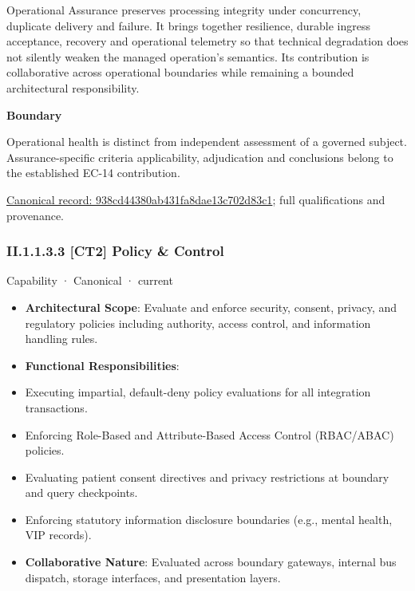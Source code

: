 Operational Assurance preserves processing integrity under concurrency, duplicate delivery and failure. It brings together resilience, durable ingress acceptance, recovery and operational telemetry so that technical degradation does not silently weaken the managed operation's semantics. Its contribution is collaborative across operational boundaries while remaining a bounded architectural responsibility.



\textbf{Boundary}



Operational health is distinct from independent assessment of a governed subject. Assurance-specific criteria applicability, adjudication and conclusions belong to the established EC-14 contribution.


{\footnotesize \href{../../../../../../../continuum/strategy/capability/938cd44380ab431fa8dae13c702d83c1.md}{Canonical record: 938cd44380ab431fa8dae13c702d83c1}; full qualifications and provenance.}\par
\subsubsection*{II.1.1.3.3 [CT2] Policy \& Control}
\label{navigation:II.1.1.3.3}

\label{element:0c5d986cc948421a8bebcab3b74d108f}
{\small Capability · Canonical · current}\par

\begin{itemize}


\item \textbf{Architectural Scope}: Evaluate and enforce security, consent, privacy, and regulatory policies including authority, access control, and information handling rules.

\item \textbf{Functional Responsibilities}:

\item Executing impartial, default-deny policy evaluations for all integration transactions.

\item Enforcing Role-Based and Attribute-Based Access Control (RBAC/ABAC) policies.

\item Evaluating patient consent directives and privacy restrictions at boundary and query checkpoints.

\item Enforcing statutory information disclosure boundaries (e.g., mental health, VIP records).

\item \textbf{Collaborative Nature}: Evaluated across boundary gateways, internal bus dispatch, storage interfaces, and presentation layers.

\end{itemize}


